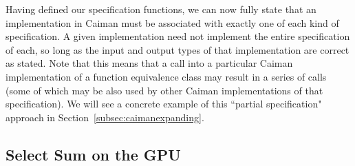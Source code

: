 Having defined our specification functions, we can now fully state that an implementation in Caiman must be associated with exactly one of each kind of specification.  A given implementation need not implement the entire specification of each, so long as the input and output types of that implementation are correct as stated.  Note that this means that a call into a particular Caiman implementation of a function equivalence class may result in a series of calls (some of which may be also used by other Caiman implementations of that specification).  We will see a concrete example of this ``partial specification" approach in Section~\ref{subsec:caimanexpanding}.
\subsection{Select Sum on the GPU}
\label{subsec:fullexample}


